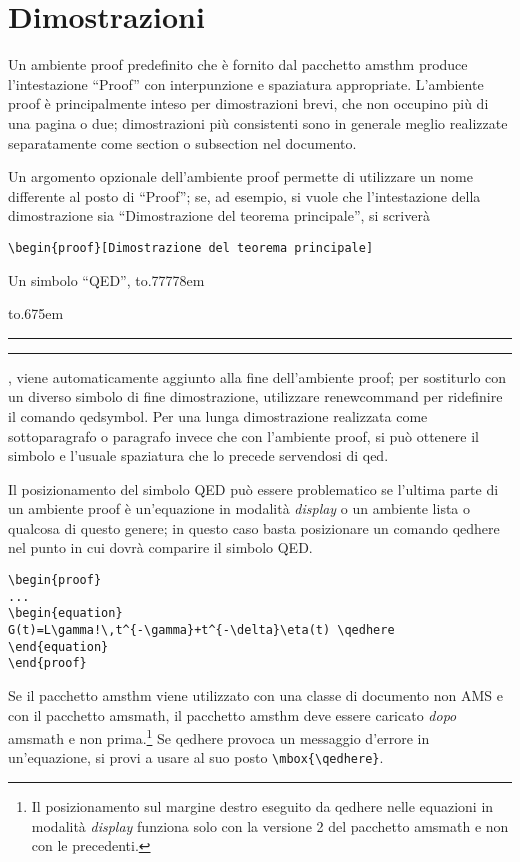 \documentclass[a4paper]{article}
\providecommand{\qq}[1]{\textquotedblleft#1\textquotedblright}
\newcommand{\ntt}{%
  \fontfamily\ttdefault \fontseries\mddefault \fontshape\updefault
  \selectfont
}
\DeclareRobustCommand{\cn}[1]{{\ntt\bslchar#1}}
\DeclareRobustCommand{\pkg}[1]{{\ntt#1}}
\DeclareRobustCommand{\env}[1]{{\ntt#1}}
\providecommand{\qedsymbol}{\leavevmode
  \hbox to.77778em{%
  \hfil\vrule
  \vbox to.675em{\hrule width.6em\vfil\hrule}%
  \vrule\hfil}}
\begin{document}
\section{Dimostrazioni}

Un ambiente \env{proof} predefinito che \`e fornito dal pacchetto \pkg{amsthm}
produce l'intestazione \qq{Proof} con interpunzione e spaziatura
appropriate.
L'ambiente \env{proof} \`e principalmente inteso per
dimostrazioni brevi, che non occupino pi\`u di una pagina o due;
dimostrazioni pi\`u consistenti sono in generale meglio realizzate
separatamente come \cn{section} o \cn{subsection} nel documento.

Un argomento opzionale dell'ambiente \env{proof} permette di utilizzare un
nome differente al posto di \qq{Proof}; se, ad esempio, si vuole che
l'intestazione della dimostrazione sia \qq{Dimostrazione del teorema
principale}, si scriver\`a
\begin{verbatim}
\begin{proof}[Dimostrazione del teorema principale]
\end{verbatim}

Un simbolo \qq{QED}, \qedsymbol, viene automaticamente aggiunto alla
fine dell'ambiente \env{proof}; per sostiturlo con un diverso simbolo di
fine dimostrazione, utilizzare \cn{renewcom\-mand} per ridefinire il comando \cn{qedsymbol}.
Per una lunga dimostrazione realizzata come sottoparagrafo o paragrafo
invece che con l'ambiente
\env{proof}, si pu\`o ottenere il simbolo e l'usuale spaziatura che lo
precede servendosi di \cn{qed}.

Il posizionamento del simbolo QED pu\`o essere problematico se l'ultima
parte di un ambiente \env{proof} \`e un'equazione in modalit\`a
\emph{display} o un ambiente lista o qualcosa di questo genere; in questo caso basta
posizionare un comando \cn{qedhere} nel punto in cui dovr\`a comparire
il simbolo QED.
\begin{verbatim}
\begin{proof}
...
\begin{equation}
G(t)=L\gamma!\,t^{-\gamma}+t^{-\delta}\eta(t) \qedhere
\end{equation}
\end{proof}
\end{verbatim}
Se il pacchetto \pkg{amsthm} viene utilizzato con una classe di documento non
AMS e con il pacchetto \pkg{amsmath}, il pacchetto \pkg{amsthm} deve
essere caricato
\emph{dopo} \pkg{amsmath} e non prima.\footnote{Il posizionamento sul
margine destro eseguito da \cn{qedhere} nelle equazioni in modalit\`a
\emph{display} funziona solo con la versione 2 del pacchetto
\pkg{amsmath} e non con le precedenti.}
Se \cn{qedhere} provoca un messaggio d'errore in un'equazione, si provi
a usare al suo posto \verb'\mbox{\qedhere}'.
\end{document}
